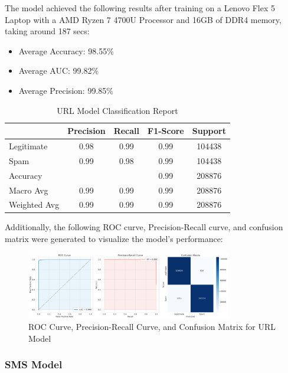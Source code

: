 \documentclass{article}
\begin{document}
\noindent
The model achieved the following results after training on a Lenovo Flex 5 Laptop with a AMD Ryzen 7 4700U Processor and 16GB of DDR4 memory, taking around 187 secs:

\begin{itemize}
    \item Average Accuracy: 98.55\%
    \item Average AUC: 99.82\%
    \item Average Precision: 99.85\%
\end{itemize} 


\begin{table}[htbp]
    \centering
    \caption{URL Model Classification Report}
    \begin{tabular}{l c c c c}
    \toprule
     & Precision & Recall & F1-Score & Support \\
    \midrule
    Legitimate & 0.98 & 0.99 & 0.99 & 104438 \\
    Spam & 0.99 & 0.98 & 0.99 & 104438 \\
    \midrule
    Accuracy & & & 0.99 & 208876 \\
    Macro Avg & 0.99 & 0.99 & 0.99 & 208876 \\
    Weighted Avg & 0.99 & 0.99 & 0.99 & 208876 \\
    \bottomrule
    \end{tabular}
    \label{tab:classification_report}
\end{table}

\noindent
Additionally, the following ROC curve, Precision-Recall curve, and confusion matrix were generated to visualize the model's performance:
\begin{figure}[htbp]
    \centering
    \includegraphics[width=0.8\textwidth]{../analysis/url/url_model_performance.png}
    \caption{ROC Curve, Precision-Recall Curve, and Confusion Matrix for URL Model}
    \label{fig:roc_curve}
\end{figure}

\subsubsection{SMS Model}
\end{document}
